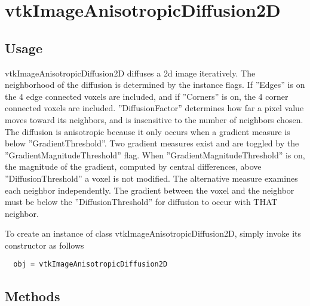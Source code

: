 \section{vtkImageAnisotropicDiffusion2D}

\subsection{Usage}

 vtkImageAnisotropicDiffusion2D  diffuses a 2d image iteratively.
 The neighborhood of the diffusion is determined by the instance
 flags. If ''Edges'' is on the 4 edge connected voxels
 are included, and if ''Corners'' is on, the 4 corner connected voxels
 are included.  ''DiffusionFactor'' determines how far a pixel value
 moves toward its neighbors, and is insensitive to the number of 
 neighbors chosen.  The diffusion is anisotropic because it only occurs
 when a gradient measure is below ''GradientThreshold''.  Two gradient measures
 exist and are toggled by the ''GradientMagnitudeThreshold'' flag.
 When ''GradientMagnitudeThreshold'' is on, the magnitude of the gradient,
 computed by central differences, above ''DiffusionThreshold''
 a voxel is not modified.  The alternative measure examines each
 neighbor independently.  The gradient between the voxel and the neighbor
 must be below the ''DiffusionThreshold'' for diffusion to occur with
 THAT neighbor.

To create an instance of class vtkImageAnisotropicDiffusion2D, simply
invoke its constructor as follows
\begin{verbatim}
  obj = vtkImageAnisotropicDiffusion2D
\end{verbatim}
\subsection{Methods}

